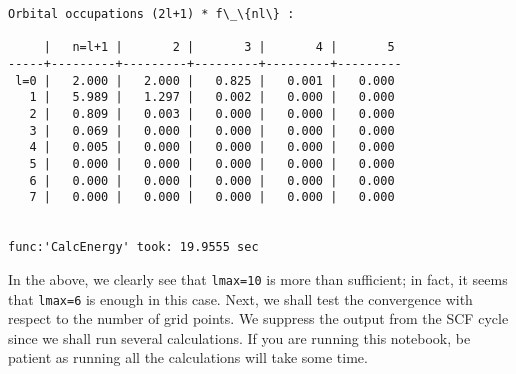 \documentclass[11pt]{article}
\begin{document}
\begin{Verbatim}[commandchars=\\\{\}]
Orbital occupations (2l+1) * f\_\{nl\} :

     |   n=l+1 |       2 |       3 |       4 |       5
-----+---------+---------+---------+---------+---------
 l=0 |   2.000 |   2.000 |   0.825 |   0.001 |   0.000
   1 |   5.989 |   1.297 |   0.002 |   0.000 |   0.000
   2 |   0.809 |   0.003 |   0.000 |   0.000 |   0.000
   3 |   0.069 |   0.000 |   0.000 |   0.000 |   0.000
   4 |   0.005 |   0.000 |   0.000 |   0.000 |   0.000
   5 |   0.000 |   0.000 |   0.000 |   0.000 |   0.000
   6 |   0.000 |   0.000 |   0.000 |   0.000 |   0.000
   7 |   0.000 |   0.000 |   0.000 |   0.000 |   0.000


func:'CalcEnergy' took: 19.9555 sec
    \end{Verbatim}

    In the above, we clearly see that \texttt{lmax=10} is more than
sufficient; in fact, it seems that \texttt{lmax=6} is enough in this
case. Next, we shall test the convergence with respect to the number of
grid points. We suppress the output from the SCF cycle since we shall
run several calculations. If you are running this notebook, be patient
as running all the calculations will take some time.
\end{document}
